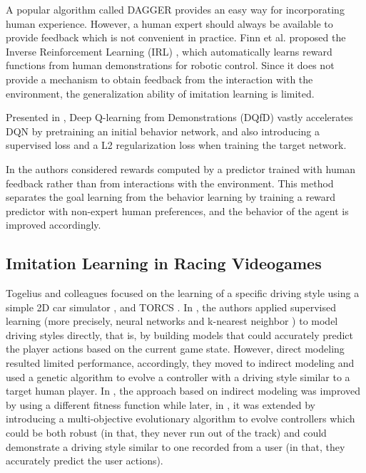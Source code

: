 A popular algorithm called DAGGER \cite{dagger} provides an easy way for incorporating human experience. However, a human expert should always be available to provide feedback which is not convenient in practice. Finn et al. proposed the Inverse Reinforcement Learning (IRL) \cite{inverse}, which automatically learns reward functions from human demonstrations for robotic control. Since it does not provide a mechanism to obtain feedback from the interaction with the environment, the generalization ability of imitation learning is limited.

Presented in \cite{dqlfd}, Deep Q-learning from Demonstrations (DQfD) vastly accelerates DQN by pretraining an initial behavior network, and also introducing a supervised loss and a L2 regularization loss when training the target network.

In \cite{drlhp} the authors considered rewards computed by a predictor trained with human feedback rather than from  interactions with the environment. This method separates the goal learning from the behavior learning by training a reward predictor with non-expert human preferences, and the behavior of the agent is improved accordingly.

\subsection{Imitation Learning in Racing Videogames}

Togelius and colleagues focused on the learning of a specific driving style using a simple 2D car simulator \cite{imit3}, \cite{imit4} and TORCS \cite{imit5}. In \cite{imit3}, the authors applied supervised learning (more precisely, neural networks and k-nearest neighbor \cite{knn}) to model driving styles directly, that is, by building models that could accurately predict the player actions based on the current game state. However, direct modeling resulted limited performance, accordingly, they moved to indirect modeling and used a genetic algorithm to evolve a controller with a driving style similar to a target human player. In \cite{imit4}, the approach based on indirect modeling was improved by using a different fitness function while later, in \cite{imit5}, it was extended by introducing a multi-objective evolutionary algorithm to evolve controllers which could be both robust (in that, they never run out of the track) and could demonstrate a driving style similar to one recorded from a user (in that, they accurately predict the user actions).


